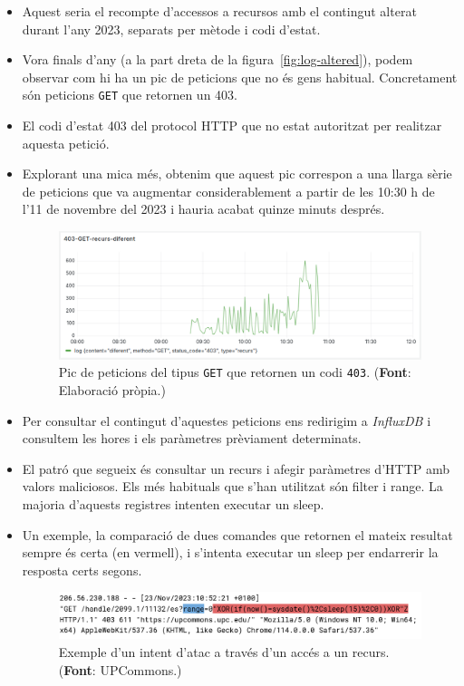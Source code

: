 \begin{itemize}
    \item Aquest seria el recompte d'accessos a recursos amb el contingut alterat durant l'any 2023, separats per mètode i codi d'estat.
    \item Vora finals d'any (a la part dreta de la figura~\ref{fig:log-altered}), podem observar com hi ha un pic de peticions que no és gens habitual.
    Concretament són peticions \texttt{GET} que retornen un 403.
    \item El codi d'estat 403 del protocol \gls{HTTP} que no estat autoritzat per realitzar aquesta petició.
    \item Explorant una mica més, obtenim que aquest pic correspon a una llarga sèrie de peticions que va augmentar considerablement a partir de les 10:30 h de l'11 de novembre del 2023 i hauria acabat quinze minuts després.
    \clearpage
    \begin{figure}[htbp]
        \centerline{\includegraphics[width=\textwidth]{figures/possible-attacks-403}}
        \captionsetup{justification=centering}
        \caption[Pic de peticions del tipus \texttt{GET} que retornen un codi \texttt{403}.]{Pic de peticions del tipus \texttt{GET} que retornen un codi \texttt{403}. (\textbf{Font}: Elaboració pròpia.)}\label{fig:possible-attacks}
    \end{figure}
    \item Per consultar el contingut d'aquestes peticions ens redirigim a \textit{InfluxDB} i consultem les hores i els paràmetres prèviament determinats.
    \item El patró que segueix és consultar un recurs i afegir paràmetres d'\gls{HTTP} amb valors maliciosos.
    Els més habituals que s'han utilitzat són filter i range.
    La majoria d'aquests registres intenten executar un sleep.
    \item Un exemple, la comparació de dues comandes que retornen el mateix resultat sempre és certa (en vermell), i s'intenta executar un sleep per endarrerir la resposta certs segons. \\
    \begin{figure}[htbp]
        \centerline{\includegraphics[width=\textwidth]{figures/log-attack}}
        \captionsetup{justification=centering}
        \caption[Exemple d'un intent d'atac a través d'un accés a un recurs.]{Exemple d'un intent d'atac a través d'un accés a un recurs. (\textbf{Font}: UPCommons.)}\label{fig:most-log-attack}
    \end{figure}
\end{itemize}

